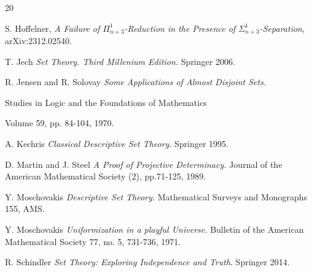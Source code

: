 \documentclass[a4paper,11pt]{article}
\begin{document}
\begin{thebibliography}{20}
    
     S. Hoffelner, \textit{A Failure of $\Pi^1_{n+3}$-Reduction in the Presence of $\Sigma^1_{n+3}$-Separation}, arXiv:2312.02540.

     

   

   
   
     T. Jech \textit{Set Theory. Third Millenium Edition.} Springer 2006.
    
    
    
    R. Jensen and R. Solovay \textit{Some Applications of Almost Disjoint Sets.}
    
    Studies in Logic and the Foundations of Mathematics
    
    Volume 59, pp. 84-104, 1970.
    
    
A. Kechris 
\textit{Classical Descriptive Set Theory}.  
Springer 1995.
    
    
    
   
     
    
      D. Martin and J. Steel \textit{A Proof of Projective Determinacy.} Journal of the American Mathematical Society (2), pp.71-125, 1989.
    
    
    
    Y. Moschovakis \textit{Descriptive Set Theory.} Mathematical Surveys and Monographs 155, AMS.
    
    
    
    Y. Moschovakis \textit{Uniformization in a playful Universe.}  Bulletin of the  American Mathematical Society 77, no. 5, 731-736, 1971.


   R. Schindler \textit{Set Theory: Exploring Independence and Truth}. Springer 2014.
    \end{thebibliography}
    
    
\end{document}
